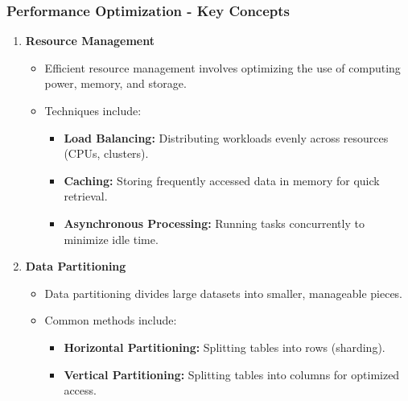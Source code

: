 \documentclass{beamer}
\begin{document}
\begin{frame}[fragile]
    \frametitle{Performance Optimization - Key Concepts}
    \begin{enumerate}
        \item \textbf{Resource Management}
            \begin{itemize}
                \item Efficient resource management involves optimizing the use of computing power, memory, and storage.
                \item Techniques include:
                    \begin{itemize}
                        \item \textbf{Load Balancing:} Distributing workloads evenly across resources (CPUs, clusters).
                        \item \textbf{Caching:} Storing frequently accessed data in memory for quick retrieval.
                        \item \textbf{Asynchronous Processing:} Running tasks concurrently to minimize idle time.
                    \end{itemize}
            \end{itemize}
        
        \item \textbf{Data Partitioning}
            \begin{itemize}
                \item Data partitioning divides large datasets into smaller, manageable pieces.
                \item Common methods include:
                    \begin{itemize}
                        \item \textbf{Horizontal Partitioning:} Splitting tables into rows (sharding).
                        \item \textbf{Vertical Partitioning:} Splitting tables into columns for optimized access.
                    \end{itemize}
            \end{itemize}
    \end{enumerate}
\end{frame}
\end{document}
